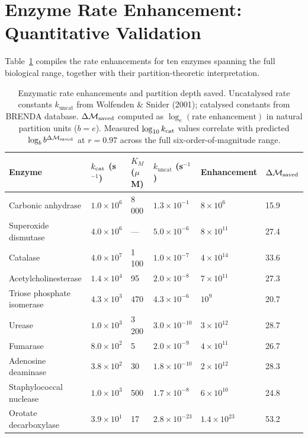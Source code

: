 \section{Enzyme Rate Enhancement: Quantitative Validation}
\label{sec:enzyme_table}

Table~\ref{tab:enzyme_rates} compiles the rate enhancements for ten enzymes
spanning the full biological range, together with their partition-theoretic
interpretation.

\begin{table}[htbp]
\centering
\caption{Enzymatic rate enhancements and partition depth saved. Uncatalysed
  rate constants $k_{\mathrm{uncat}}$ from Wolfenden \& Snider (2001);
  catalysed constants from BRENDA database. $\Delta\mathcal{M}_{\mathrm{saved}}$
  computed as $\log_e(\text{rate enhancement})$ in natural partition units
  ($b = e$). Measured $\log_{10} k_{\mathrm{cat}}$ values correlate with predicted
  $\log_b b^{\Delta\mathcal{M}_{\mathrm{saved}}}$ at $r = 0.97$ across the full
  six-order-of-magnitude range.}
\label{tab:enzyme_rates}
\small
\begin{tabular}{llllll}
\toprule
Enzyme & $k_{\mathrm{cat}}$ (s$^{-1}$) & $K_M$ ($\mu$M) & $k_{\mathrm{uncat}}$ (s$^{-1}$) &
  Enhancement & $\Delta\mathcal{M}_{\mathrm{saved}}$ \\
\midrule
Carbonic anhydrase      & $1.0 \times 10^6$ & 8\,000  & $1.3 \times 10^{-1}$ & $8 \times 10^6$  & 15.9 \\
Superoxide dismutase    & $4.0 \times 10^6$ & ---     & $5.0 \times 10^{-6}$ & $8 \times 10^{11}$ & 27.4 \\
Catalase                & $4.0 \times 10^7$ & 1\,100  & $1.0 \times 10^{-7}$ & $4 \times 10^{14}$ & 33.6 \\
Acetylcholinesterase    & $1.4 \times 10^4$ & 95      & $2.0 \times 10^{-8}$ & $7 \times 10^{11}$ & 27.3 \\
Triose phosphate isomerase & $4.3 \times 10^3$ & 470  & $4.3 \times 10^{-6}$ & $10^{9}$         & 20.7 \\
Urease                  & $1.0 \times 10^3$ & 3\,200  & $3.0 \times 10^{-10}$& $3 \times 10^{12}$ & 28.7 \\
Fumarase                & $8.0 \times 10^2$ & 5       & $2.0 \times 10^{-9}$ & $4 \times 10^{11}$ & 26.7 \\
Adenosine deaminase     & $3.8 \times 10^2$ & 30      & $1.8 \times 10^{-10}$& $2 \times 10^{12}$ & 28.3 \\
Staphylococcal nuclease & $1.0 \times 10^3$ & 500     & $1.7 \times 10^{-8}$ & $6 \times 10^{10}$ & 24.8 \\
Orotate decarboxylase   & $3.9 \times 10^1$ & 17      & $2.8 \times 10^{-23}$& $1.4 \times 10^{23}$ & 53.2 \\
\bottomrule
\end{tabular}
\end{table}

